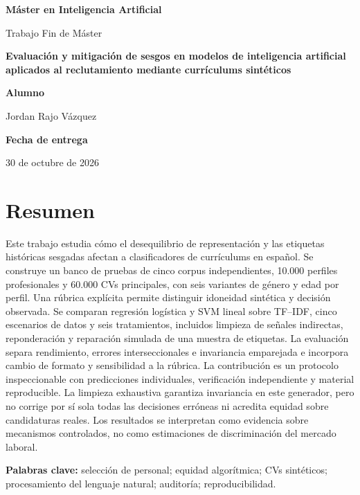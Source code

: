 \documentclass[11pt,a4paper,oneside]{report}
\newcommand{\tituloTFM}{Evaluación y mitigación de sesgos en modelos de inteligencia artificial aplicados al reclutamiento mediante currículums sintéticos}
\begin{document}
\begin{titlepage}
\centering
\vspace*{1.2cm}
{\Large\bfseries Máster en Inteligencia Artificial\par}
\vspace{2.1cm}
{\large Trabajo Fin de Máster\par}
\vspace{1cm}
{\LARGE\bfseries\tituloTFM\par}
\vfill
{\large\textbf{Alumno}\par}
\vspace{0.2cm}
{\Large Jordan Rajo Vázquez\par}
\vspace{1.2cm}
{\large\textbf{Fecha de entrega}\par}
\vspace{0.2cm}
{\large 30 de octubre de 2026\par}
\vspace*{1cm}
\end{titlepage}

\chapter*{Resumen}
Este trabajo estudia cómo el desequilibrio de representación y las etiquetas históricas sesgadas afectan a clasificadores de currículums en español. Se construye un banco de pruebas de cinco corpus independientes, 10.000 perfiles profesionales y 60.000 CVs principales, con seis variantes de género y edad por perfil. Una rúbrica explícita permite distinguir idoneidad sintética y decisión observada. Se comparan regresión logística y SVM lineal sobre TF--IDF, cinco escenarios de datos y seis tratamientos, incluidos limpieza de señales indirectas, reponderación y reparación simulada de una muestra de etiquetas. La evaluación separa rendimiento, errores interseccionales e invariancia emparejada e incorpora cambio de formato y sensibilidad a la rúbrica. La contribución es un protocolo inspeccionable con predicciones individuales, verificación independiente y material reproducible. La limpieza exhaustiva garantiza invariancia en este generador, pero no corrige por sí sola todas las decisiones erróneas ni acredita equidad sobre candidaturas reales. Los resultados se interpretan como evidencia sobre mecanismos controlados, no como estimaciones de discriminación del mercado laboral.

\noindent\textbf{Palabras clave:} selección de personal; equidad algorítmica; CVs sintéticos; procesamiento del lenguaje natural; auditoría; reproducibilidad.
\end{document}
